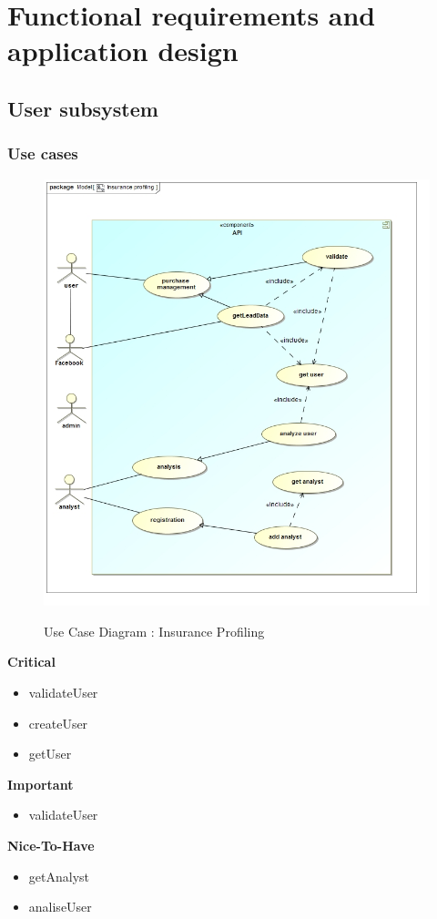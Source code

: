 \documentclass{article}
\begin{document}
\section{Functional requirements and application design}
	\subsection{User subsystem}
		\subsubsection{Use cases}

		\begin{figure}[H]
		\includegraphics[width=\textwidth]{images/uc__Insurance_profiling.jpg}  \\
		\caption{Use Case Diagram : Insurance Profiling}
		\end{figure}

		\begin{flushleft}
			\textbf{Critical}
				\begin{itemize}
	  				\item validateUser
	  				\item createUser
	  				\item getUser
				\end{itemize}
			\textbf{Important}
				\begin{itemize}
	  				\item validateUser
				\end{itemize}

			\textbf{Nice-To-Have}
				\begin{itemize}
	  				\item getAnalyst
	  				\item analiseUser
				\end{itemize}
		\end{flushleft}
\end{document}
